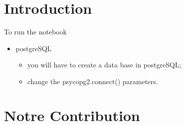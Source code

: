 \section{Introduction}\label{sec:introduction}

To run the notebook

\begin{itemize}[label=\(\blacktriangleright\)]
    \item postgreSQL
          \begin{itemize}[label=\(\blacktriangleright\)]
              \item you will have to create a data base in postgreSQL;
              \item change the psycopg2.connect() parameters.
          \end{itemize}
\end{itemize}

\section{Notre Contribution}\label{sec:contrib}

